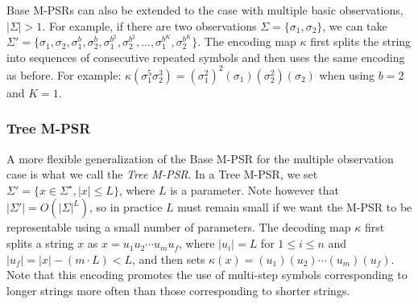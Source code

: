 \documentclass[letterpaper]{article}
\begin{document}



Base M-PSRs can also be extended to the case with multiple basic observations, $|\Sigma| > 1$. For example, if there are two observations $\Sigma = \{\sigma_1, \sigma_2\}$, we can take $\Sigma' = \{\sigma_1,\sigma_2,\sigma_1^b,\sigma_2^{b},\sigma_1^{b^2},\sigma_2^{b^2}, ...,\sigma_1^{b^K},\sigma_2^{b^K}\}$. The encoding map $\kappa$ first splits the string into sequences of consecutive repeated symbols and then uses the same encoding as before. For example: $\kappa(\sigma_1^5 \sigma_2^3)=(\sigma_1^2)^2(\sigma_1)(\sigma_2^2)(\sigma_2)$ when using $b = 2$ and $K = 1$.

\subsubsection{Tree M-PSR}
 
A more flexible generalization of the Base M-PSR for the multiple observation case is what we call the \emph{Tree M-PSR}. In a Tree M-PSR, we set $\Sigma'= \{x \in \Sigma^\star, |x| \leq L\}$, where $L$ is a parameter. Note however that $|\Sigma'|= O({|\Sigma|}^L)$, so in practice $L$ must remain small if we want the M-PSR to be representable using a small number of parameters. The decoding map $\kappa$ first splits a string $x$ as $x=u_1 u_2 \cdots u_m u_f$, where $|u_i| = L$ for $1 \leq i \leq n$ and $|u_f| =|x|-(m \cdot L) < L$, and then sets $\kappa(x) = (u_1)(u_2) \cdots (u_m) (u_f)$. Note that this encoding promotes the use of multi-step symbols corresponding to longer strings more often than those corresponding to shorter strings.
\end{document}
